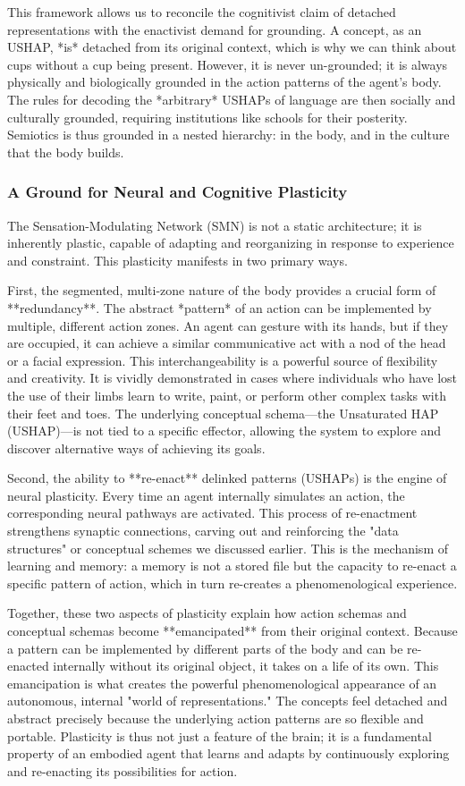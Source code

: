 This framework allows us to reconcile the cognitivist claim of detached representations with the enactivist demand for grounding. A concept, as an USHAP, *is* detached from its original context, which is why we can think about cups without a cup being present. However, it is never un-grounded; it is always physically and biologically grounded in the action patterns of the agent's body. The rules for decoding the *arbitrary* USHAPs of language are then socially and culturally grounded, requiring institutions like schools for their posterity. Semiotics is thus grounded in a nested hierarchy: in the body, and in the culture that the body builds.

\subsubsection*{A Ground for Neural and Cognitive Plasticity}
The Sensation-Modulating Network (SMN) is not a static architecture; it is inherently plastic, capable of adapting and reorganizing in response to experience and constraint. This plasticity manifests in two primary ways.

First, the segmented, multi-zone nature of the body provides a crucial form of **redundancy**. The abstract *pattern* of an action can be implemented by multiple, different action zones. An agent can gesture with its hands, but if they are occupied, it can achieve a similar communicative act with a nod of the head or a facial expression. This interchangeability is a powerful source of flexibility and creativity. It is vividly demonstrated in cases where individuals who have lost the use of their limbs learn to write, paint, or perform other complex tasks with their feet and toes. The underlying conceptual schema—the Unsaturated HAP (USHAP)—is not tied to a specific effector, allowing the system to explore and discover alternative ways of achieving its goals.

Second, the ability to **re-enact** delinked patterns (USHAPs) is the engine of neural plasticity. Every time an agent internally simulates an action, the corresponding neural pathways are activated. This process of re-enactment strengthens synaptic connections, carving out and reinforcing the "data structures" or conceptual schemes we discussed earlier. This is the mechanism of learning and memory: a memory is not a stored file but the capacity to re-enact a specific pattern of action, which in turn re-creates a phenomenological experience.

Together, these two aspects of plasticity explain how action schemas and conceptual schemas become **emancipated** from their original context. Because a pattern can be implemented by different parts of the body and can be re-enacted internally without its original object, it takes on a life of its own. This emancipation is what creates the powerful phenomenological appearance of an autonomous, internal "world of representations." The concepts feel detached and abstract precisely because the underlying action patterns are so flexible and portable. Plasticity is thus not just a feature of the brain; it is a fundamental property of an embodied agent that learns and adapts by continuously exploring and re-enacting its possibilities for action.
